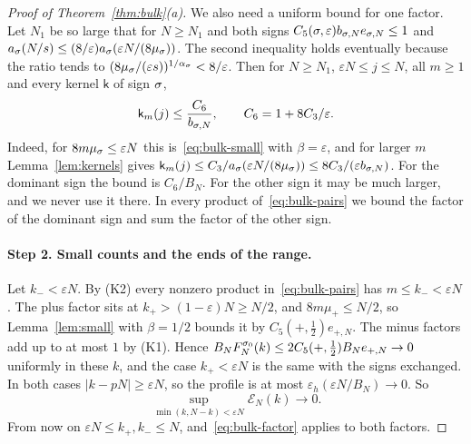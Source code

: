 \begin{proof}[Proof of Theorem~\ref{thm:bulk}(a)]
We also need a uniform bound for one factor. Let $N_1$ be so large that for $N\ge N_1$
and both signs $C_5(\sigma,\varepsilon)b_{\sigma,N}e_{\sigma,N}\le1$ and
$a_\sigma(N/s)\le(8/\varepsilon)a_\sigma(\varepsilon N/(8\mu_\sigma))$. The second inequality
holds eventually because the ratio tends to
$(8\mu_\sigma/(\varepsilon s))^{1/\alpha_\sigma}<8/\varepsilon$. Then for $N\ge N_1$,
$\varepsilon N\le j\le N$, all $m\ge1$ and every kernel $\mathsf k$ of sign $\sigma$,
\begin{equation}\label{eq:bulk-factor}
 \mathsf k_m(j)\le\frac{C_6}{b_{\sigma,N}},\qquad C_6=1+8C_3/\varepsilon .
\end{equation}
Indeed, for $8m\mu_\sigma\le\varepsilon N$ this is~\eqref{eq:bulk-small} with
$\beta=\varepsilon$, and for larger $m$ Lemma~\ref{lem:kernels} gives
$\mathsf k_m(j)\le C_3/a_\sigma(\varepsilon N/(8\mu_\sigma))\le 8C_3/(\varepsilon b_{\sigma,N})$. For
the dominant sign the bound is $C_6/B_N$. For the other sign it may be much larger,
and we never use it there. In every product of~\eqref{eq:bulk-pairs} we bound the
factor of the dominant sign and sum the factor of the other sign.

\paragraph{Step 2. Small counts and the ends of the range.}
Let $k_\minus<\varepsilon N$. By (K2) every nonzero product in~\eqref{eq:bulk-pairs} has
$m\le k_\minus<\varepsilon N$. The plus factor sits at $k_\plus>(1-\varepsilon)N\ge N/2$,
and $8m\mu_\plus\le N/2$, so Lemma~\ref{lem:small} with $\beta=1/2$ bounds it by
$C_5(\plus,\tfrac12)e_{\plus,N}$. The minus factors add up to at most $1$ by (K1).
Hence $B_NF^{\sigma_0}_N(k)\le2C_5({+},\tfrac12)B_Ne_{{+},N}\to0$ uniformly in these $k$,
and the case $k_\plus<\varepsilon N$ is the same with the signs exchanged. In both cases
$|k-pN|\ge\varepsilon N$, so the profile is at most $\varepsilon_h(\varepsilon N/B_N)\to0$.
So
\begin{equation}\label{eq:bulk-ends}
 \sup_{\min(k,N-k)<\varepsilon N}\mathcal E_N(k)\to0 .
\end{equation}
From now on $\varepsilon N\le k_\plus,k_\minus\le N$, and~\eqref{eq:bulk-factor} applies
to both factors.


\end{proof}
